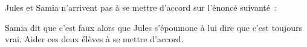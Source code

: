 \documentclass[exercice]{thedocument}%
\begin{document}
%
Jules et Samia n'arrivent pas à se mettre d'accord sur l'énoncé suivanté~:\par
{}\par
Samia dit que c'est faux alors que Jules s'époumone à lui dire que c'est
toujours vrai. Aider ces deux élèves à se mettre d'accord.
\end{document}
